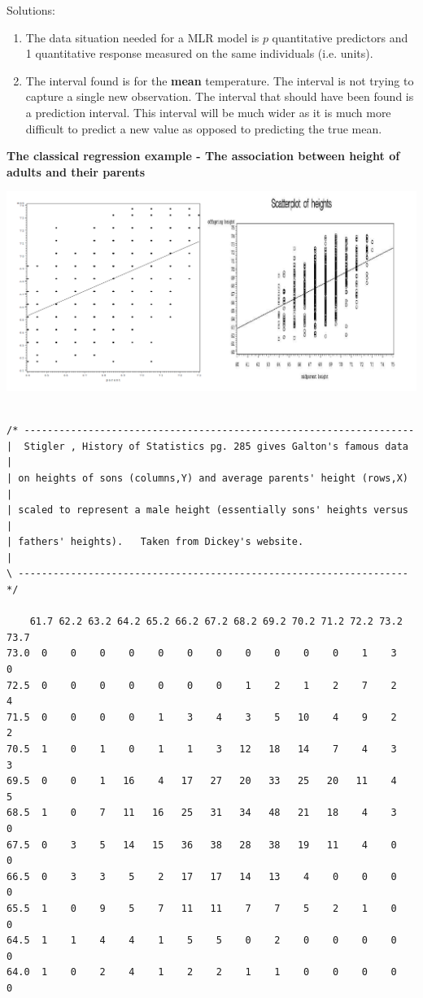 \documentclass{report}
\begin{document}
Solutions:
\begin{enumerate}
\item The data situation needed for a MLR model is $p$ quantitative predictors and 1 quantitative response measured on the same individuals (i.e. units).
\item The interval found is for the \textbf{mean} temperature.  The interval is not trying to capture a single new observation.  The interval that should have been found is a prediction interval.  This interval will be much wider as it is much more difficult to predict a new value as opposed to predicting the true mean.
\end{enumerate}

\newpage

\textbf{The classical regression example - The association between height of adults and their parents}
\begin{center}
\includegraphics[scale=0.4]{galton}
\begin{small}
\begin{verbatim}

/* -------------------------------------------------------------------
|  Stigler , History of Statistics pg. 285 gives Galton's famous data |
| on heights of sons (columns,Y) and average parents' height (rows,X) |
| scaled to represent a male height (essentially sons' heights versus |
| fathers' heights).   Taken from Dickey's website.                   |
\ -------------------------------------------------------------------*/

    61.7 62.2 63.2 64.2 65.2 66.2 67.2 68.2 69.2 70.2 71.2 72.2 73.2 73.7
73.0  0    0    0    0    0    0    0    0    0    0    0    1    3    0
72.5  0    0    0    0    0    0    0    1    2    1    2    7    2    4
71.5  0    0    0    0    1    3    4    3    5   10    4    9    2    2
70.5  1    0    1    0    1    1    3   12   18   14    7    4    3    3
69.5  0    0    1   16    4   17   27   20   33   25   20   11    4    5
68.5  1    0    7   11   16   25   31   34   48   21   18    4    3    0
67.5  0    3    5   14   15   36   38   28   38   19   11    4    0    0
66.5  0    3    3    5    2   17   17   14   13    4    0    0    0    0
65.5  1    0    9    5    7   11   11    7    7    5    2    1    0    0
64.5  1    1    4    4    1    5    5    0    2    0    0    0    0    0
64.0  1    0    2    4    1    2    2    1    1    0    0    0    0    0
\end{verbatim}
\end{small}
\end{center}
\end{document}
